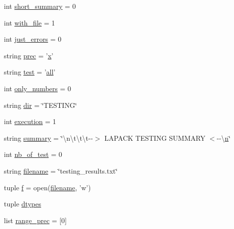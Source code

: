 \begin{DoxyCompactItemize}
\item 
int \hyperlink{namespacelapack__testing_a5a7ce41a3e701dcdb16b4d9855284cb9}{short\+\_\+summary} = 0
\item 
int \hyperlink{namespacelapack__testing_a2d078e384760a2e10c6b6595a16f7083}{with\+\_\+file} = 1
\item 
int \hyperlink{namespacelapack__testing_a67160254671ff72dd81a11526d5e2afc}{just\+\_\+errors} = 0
\item 
string \hyperlink{namespacelapack__testing_a9a99ca70c54c28f6599102af8b98e744}{prec} = '\hyperlink{vecnorm1_8cc_ac73eed9e41ec09d58f112f06c2d6cb63}{x}'
\item 
string \hyperlink{namespacelapack__testing_a2f56496c4a316d0806ded6777fc7cb96}{test} = '\hyperlink{vecall_8cc_a59f643f49235ae1c218fba12f5748ab7}{all}'
\item 
int \hyperlink{namespacelapack__testing_a75639e8762c6fd4dc5833cdcc2216df0}{only\+\_\+numbers} = 0
\item 
string \hyperlink{namespacelapack__testing_a625991254a74cd8dab9f53cbd3d8df41}{dir} = \char`\"{}T\+E\+S\+T\+I\+N\+G\char`\"{}
\item 
int \hyperlink{namespacelapack__testing_ad7e20095c10346b2012d859553653966}{execution} = 1
\item 
string \hyperlink{namespacelapack__testing_a38bbd488ad7e157fb4081072b0ea6e0c}{summary} = \char`\"{}\textbackslash{}n\textbackslash{}t\textbackslash{}t\textbackslash{}t-\/-\/$>$ L\+A\+P\+A\+C\+K T\+E\+S\+T\+I\+N\+G S\+U\+M\+M\+A\+R\+Y $<$-\/-\/\textbackslash{}\hyperlink{indexexpr_8h_ab427e2e2b4d6cec55fa088ea2a692ace}{n}\char`\"{}
\item 
int \hyperlink{namespacelapack__testing_a13eed2214e37dac5dfcccc85bb54e0ff}{nb\+\_\+of\+\_\+test} = 0
\item 
string \hyperlink{namespacelapack__testing_aa53400ed106a6e9deffab44779c74f7b}{filename} = \char`\"{}testing\+\_\+results.\+txt\char`\"{}
\item 
tuple \hyperlink{namespacelapack__testing_a1253c46dadde4ab0f214f59fda7810bb}{f} = open(\hyperlink{namespacelapack__testing_aa53400ed106a6e9deffab44779c74f7b}{filename}, 'w')
\item 
tuple \hyperlink{namespacelapack__testing_a38154b83ac1c2b82c82b8281944aa66e}{dtypes}
\item 
list \hyperlink{namespacelapack__testing_aba2d4997c8b45c303041fdb75ffb4d0b}{range\+\_\+prec} = \mbox{[}0\mbox{]}
\item 

\end{DoxyCompactItemize}
